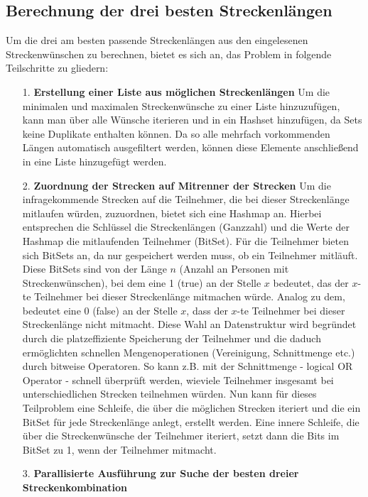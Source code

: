 \documentclass[a4paper,10pt,ngerman]{scrartcl}
\begin{document}
\subsection{Berechnung der drei besten Streckenlängen}
Um die drei am besten passende Streckenlängen aus den eingelesenen Streckenwünschen zu berechnen, bietet es sich an, das Problem in folgende Teilschritte zu gliedern:
\begin{itemize}
  \item [1.] \textbf{Erstellung einer Liste aus möglichen Streckenlängen}
  \newline
  Um die minimalen und maximalen Streckenwünsche zu einer Liste hinzuzufügen, kann man über alle Wünsche iterieren und in ein Hashset hinzufügen, da Sets keine Duplikate enthalten können. Da so alle mehrfach vorkommenden Längen automatisch ausgefiltert werden, können diese Elemente anschließend 
  in eine Liste hinzugefügt werden.
  \item [2.] \textbf{Zuordnung der Strecken auf Mitrenner der Strecken}
  \newline
  Um die infragekommende Strecken auf die Teilnehmer, die bei dieser Streckenlänge mitlaufen würden, zuzuordnen, bietet sich eine Hashmap an. Hierbei entsprechen die Schlüssel die Streckenlängen (Ganzzahl) und die Werte der Hashmap die mitlaufenden Teilnehmer (BitSet). Für die Teilnehmer bieten sich BitSets an, da nur
  gespeichert werden muss, ob ein Teilnehmer mitläuft. Diese BitSets sind von der Länge $n$ (Anzahl an Personen mit Streckenwünschen), bei dem eine 1 (true) an der Stelle $x$ bedeutet, das der $x$-te Teilnehmer bei dieser Streckenlänge mitmachen würde.
  Analog zu dem, bedeutet eine 0 (false) an der Stelle $x$, dass der $x$-te Teilnehmer bei dieser Streckenlänge nicht mitmacht. Diese Wahl an Datenstruktur wird begründet durch die platzeffiziente Speicherung der Teilnehmer und die daduch ermöglichten schnellen
  Mengenoperationen (Vereinigung, Schnittmenge etc.) durch bitweise Operatoren. So kann z.B. mit der Schnittmenge - logical OR Operator - schnell überprüft werden, wieviele Teilnehmer insgesamt bei unterschiedlichen Strecken teilnehmen würden. 
  Nun kann für dieses Teilproblem eine Schleife, die über die möglichen Strecken iteriert und die ein BitSet für jede Streckenlänge anlegt, erstellt werden. Eine innere Schleife, die über die Streckenwünsche der Teilnehmer iteriert, setzt dann die Bits im BitSet zu 1, wenn der Teilnehmer mitmacht.
  \item [3.] \textbf{Parallisierte Ausführung zur Suche der besten dreier Streckenkombination}

\end{itemize}
\end{document}
